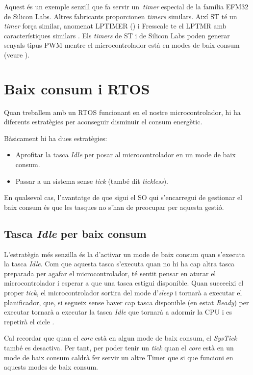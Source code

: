 Aquest és un exemple senzill que fa servir un {\em timer} especial de la família EFM32 de Silicon Labs. Altres fabricants proporcionen {\em timers} similars. Així ST té un {\em timer} força similar, anomenat LPTIMER (\cite{ST_ANS4865}) i Fresscale te el LPTMR amb característiques similars \cite{Kinetis_LPTMR}. Els {\em timers} de ST i de Silicon Labs  poden generar senyals tipus \gls{PWM} mentre el microcontrolador està en modes de baix consum (veure ).

\section{Baix consum i RTOS}
\label{sec:lowpwerRTOS}
Quan treballem amb un RTOS funcionant en el nostre microcontrolador, hi ha diferents estratègies per aconseguir disminuir el consum energètic.

Bàsicament hi ha dues estratègies:
\begin{itemize}
 \item Aprofitar la tasca {\em Idle} per posar al microcontrolador en un mode de baix consum.
 \item Passar a un sistema sense {\em tick} (també dit {\em tickless}).
\end{itemize}

En qualsevol cas, l'avantatge de que sigui el SO qui s'encarregui de gestionar el baix consum és que les tasques no s'han de preocupar per aquesta gestió.

\subsection{Tasca {\em Idle} per baix consum}
\label{sub:idlelowpower}
L'estratègia més senzilla és la d'activar un mode de baix consum quan s'executa la tasca {\em Idle}. Com que aquesta tasca s'executa quan no hi ha cap altra tasca preparada per agafar el microcontrolador, té sentit pensar en aturar el microcontrolador i esperar a que una tasca estigui disponible. Quan succeeixi el proper {\em tick}, el microcontrolador sortira del mode d'{\em sleep} i tornarà a executar el planificador, que, si segueix sense haver cap tasca disponible (en estat {\em Ready}) per executar tornarà a executar la tasca {\em Idle} que tornarà a adormir la CPU i es repetirà el cicle \cite{FreeRTOSLP}.

\begin{remark}
Cal recordar que quan el {\em core} està en algun mode de baix consum, el {\em SysTick} també es desactiva. Per tant, per poder tenir un {\em tick} quan el {\em core} està en un mode de baix consum caldrà fer servir un altre Timer que si que funcioni en aquests modes de baix consum.
\end{remark}

